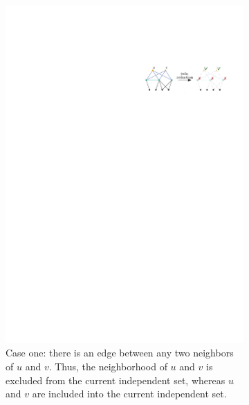 \documentclass[12pt,a4paper,twoside]{scrartcl}
\numberwithin{equation}{section}
\begin{document}
\begin{figure}[htb]
	\centering
	\captionsetup[subfigure]{aboveskip=1em,belowskip=1em}
	\captionsetup{belowskip=-1em, aboveskip=0em}
	\begin{subfigure}{\textwidth}
		\centering
		\includegraphics[scale=1.5]{images/twin_red_2}
		\caption{Case one: there is an edge between any two neighbors of $u$ and $v$. Thus, the neighborhood of $u$ and $v$ is excluded from the current independent set, whereas $u$ and $v$ are included into the current independent set.}
	\end{subfigure}
	\begin{subfigure}{\textwidth}
		\centering

\end{subfigure}
\end{figure}
\end{document}
